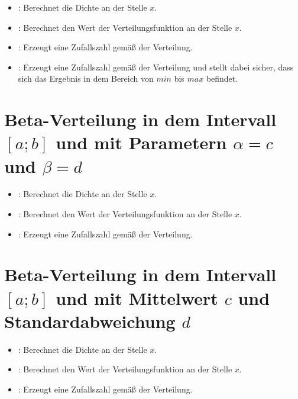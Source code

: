 \begin{itemize}

\item
{}:
Berechnet die Dichte an der Stelle $x$.

\item
{}:
Berechnet den Wert der Verteilungsfunktion an der Stelle $x$.

\item
{}:
Erzeugt eine Zufallszahl gemäß der Verteilung.

\item
{}:
Erzeugt eine Zufallszahl gemäß der Verteilung und stellt dabei sicher, dass sich das Ergebnis in dem Bereich von $min$ bis $max$ befindet.

\end{itemize}



\section{Beta-Verteilung in dem Intervall \texorpdfstring{$[a;b]$}{[a;b]} und mit Parametern \texorpdfstring{$\alpha=c$}{c} und \texorpdfstring{$\beta=d$}{d}}

\begin{itemize}

\item
{}:
Berechnet die Dichte an der Stelle $x$.

\item
{}:
Berechnet den Wert der Verteilungsfunktion an der Stelle $x$.

\item
{}:
Erzeugt eine Zufallszahl gemäß der Verteilung.

\end{itemize}



\section{Beta-Verteilung in dem Intervall \texorpdfstring{$[a;b]$}{[a;b]} und mit Mittelwert \texorpdfstring{$c$}{c} und Standardabweichung \texorpdfstring{$d$}{d}}

\begin{itemize}

\item
{}:
Berechnet die Dichte an der Stelle $x$.

\item
{}:
Berechnet den Wert der Verteilungsfunktion an der Stelle $x$.

\item
{}:
Erzeugt eine Zufallszahl gemäß der Verteilung.

\end{itemize}



